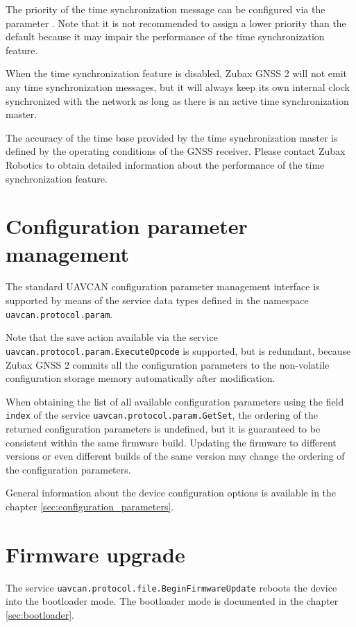 \documentclass{zubaxdoc}
\begin{document}
The priority of the time synchronization message can be configured via the parameter
.
Note that it is not recommended to assign a lower priority than the default because it may impair
the performance of the time synchronization feature.

When the time synchronization feature is disabled,
Zubax GNSS 2 will not emit any time synchronization messages,
but it will always keep its own internal clock synchronized with the network
as long as there is an active time synchronization master.

The accuracy of the time base provided by the time synchronization master is defined by the
operating conditions of the GNSS receiver.
Please contact Zubax Robotics to obtain detailed information about the performance of the
time synchronization feature.

\section{Configuration parameter management}

The standard UAVCAN configuration parameter management interface is supported
by means of the service data types defined in the namespace \verb|uavcan.protocol.param|.

Note that the save action available via the service \verb|uavcan.protocol.param.ExecuteOpcode|
is supported, but is redundant, because Zubax GNSS 2 commits all the configuration parameters
to the non-volatile configuration storage memory automatically after modification.

When obtaining the list of all available configuration parameters using the field \verb|index|
of the service \verb|uavcan.protocol.param.GetSet|, the ordering of the returned configuration
parameters is undefined, but it is guaranteed to be consistent within the same firmware build.
Updating the firmware to different versions or even different builds of the same version
may change the ordering of the configuration parameters.

General information about the device configuration options is available in the chapter 
\ref{sec:configuration_parameters}.

\section{Firmware upgrade}

The service \verb|uavcan.protocol.file.BeginFirmwareUpdate| reboots the device into the bootloader
mode.
The bootloader mode is documented in the chapter \ref{sec:bootloader}.
\end{document}
